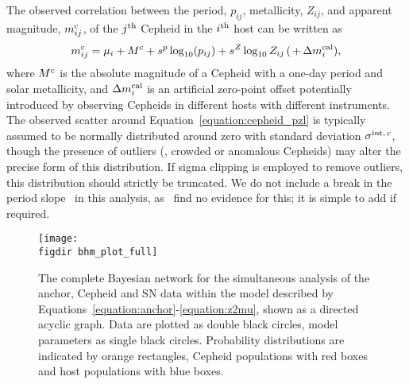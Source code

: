 \documentclass[a4paper,fleqn,usenatbib]{mnras}
\newcommand{\riess}{\citetalias{Riess_etal:2016}}
\newcommand{\slopep}{\ensuremath{s^p}}
\newcommand{\slopeZ}{\ensuremath{s^Z}}
\newcommand{\Mstdc}{\ensuremath{M^{\rm c}}}
\newcommand{\sigintc}{\ensuremath{\sigma^{\rm int,\,c}}}
\newcommand{\dmcal}{\ensuremath{\Delta m_i^{\rm cal}}}
\newcommand{\mc}{\ensuremath{m_{ij}^{\rm c}}}
\begin{document}
{The observed correlation between the period, $p_{ij}$, metallicity, $Z_{ij}$, and apparent magnitude, $\mc$, of the $j^{\rm th}$ Cepheid in the $i^{\rm th}$ host can be written as
\begin{equation}
\mc = \mu_i + \Mstdc + \slopep \log_{10} (p_{ij}) + \slopeZ \log_{10} Z_{ij} \,(\,+\,\dmcal),
\label{equation:cepheid_pzl}
\end{equation}
where
$\Mstdc$ is the absolute magnitude of a Cepheid with a one-day period and solar metallicity, and $\dmcal$ is an artificial zero-point offset potentially introduced by observing Cepheids in different hosts with different instruments. The observed scatter around Equation~\ref{equation:cepheid_pzl} is typically assumed to be normally distributed around zero with standard deviation $\sigintc$, though the presence of outliers (\eg, crowded or anomalous Cepheids) may alter the precise form of this distribution. If sigma clipping is employed to remove outliers, this distribution should strictly be truncated. We do not include a break in the period slope~\citep{Ngeow_Kanbur:2005,Kodric_etal:2015} in this analysis, as \riess\ find no evidence for this; it is simple to add if required.

\begin{landscape}
\begin{figure}
\texttt{[image: \\figdir bhm\_plot\_full]}
\caption{The complete Bayesian network for the simultaneous analysis of the anchor, Cepheid and SN data within the model described by Equations~\ref{equation:anchor}-\ref{equation:z2mu}, shown as a directed acyclic graph. Data are plotted as double black circles, model parameters as single black circles. Probability distributions are indicated by orange rectangles, Cepheid populations with red boxes and host populations with blue boxes.}
\label{figure:network_full}
\end{figure}
\end{landscape}

}
\end{document}
